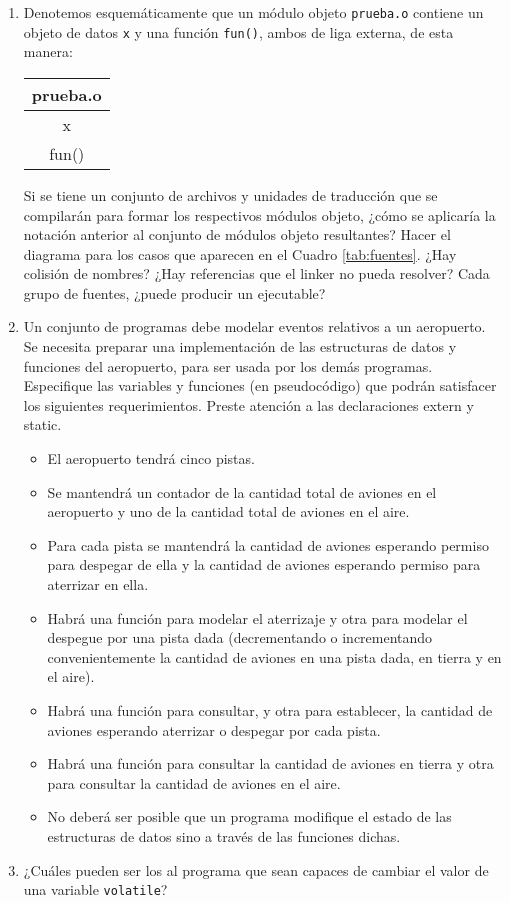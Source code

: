 \begin{enumerate}
\item Denotemos esquemáticamente que un módulo objeto \lstinline{prueba.o} contiene un objeto de datos
\lstinline{x} y una función \lstinline{fun()}, ambos de liga externa, de esta manera:


\begin{tabular}{|c|}
\hline
prueba.o\\
\hline
x\\
fun()\\
\hline
\end{tabular}

Si se tiene un conjunto de archivos y unidades de traducción que se compilarán para formar los
respectivos módulos objeto, ¿cómo se aplicaría la notación anterior al conjunto de módulos objeto
resultantes? Hacer el diagrama para los casos que aparecen en el Cuadro \ref{tab:fuentes}. ¿Hay colisión de nombres? ¿Hay referencias que el linker no pueda resolver? Cada grupo de fuentes, ¿puede producir un ejecutable?

\item  Un conjunto de programas debe modelar eventos relativos a un aeropuerto. Se necesita preparar una
implementación de las estructuras de datos y funciones del aeropuerto, para ser usada por los demás
programas. Especifique las variables y funciones (en pseudocódigo) que podrán satisfacer los
siguientes requerimientos. Preste atención a las declaraciones extern y static.
\begin{itemize}
	\item El aeropuerto tendrá cinco pistas.
\item Se mantendrá un contador de la cantidad total de aviones en el aeropuerto y uno de la cantidad
total de aviones en el aire.
\item Para cada pista se mantendrá la cantidad de aviones esperando permiso para despegar de ella y la
cantidad de aviones esperando permiso para aterrizar en ella.
\item Habrá una función para modelar el aterrizaje y otra para modelar el despegue por una pista dada
(decrementando o incrementando convenientemente la cantidad de aviones en una pista dada, en
tierra y en el aire).
\item Habrá una función para consultar, y otra para establecer, la cantidad de aviones esperando
aterrizar o despegar por cada pista.
\item Habrá una función para consultar la cantidad de aviones en tierra y otra para consultar la cantidad
de aviones en el aire.
\item No deberá ser posible que un programa modifique el estado de las estructuras de datos sino a
través de las funciones dichas.
\end{itemize}
\item ¿Cuáles pueden ser los  al programa que sean capaces de cambiar el valor de una variable \lstinline{volatile}?
\end{enumerate}


